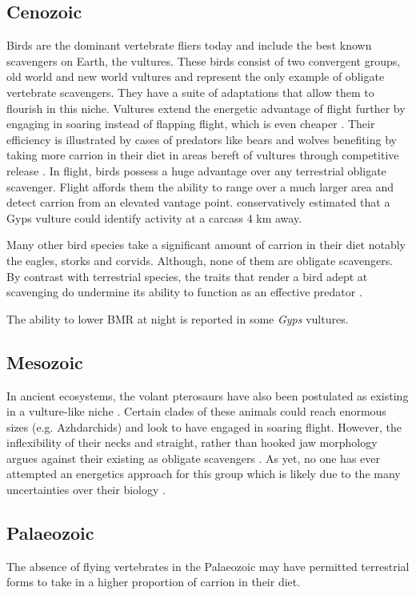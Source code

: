 \documentclass[a4paper,12pt]{article}
\begin{document}
\subsection*{Cenozoic}
Birds are the dominant vertebrate fliers today and include the best known scavengers on Earth, the vultures. 
These birds consist of two convergent groups, old world and new world vultures and represent the only example of obligate vertebrate scavengers. 
They have a suite of adaptations that allow them to flourish in this niche.
Vultures extend the energetic advantage of flight further by engaging in soaring instead of flapping flight, which is even cheaper \citep{hedenstrom1993migration}.
Their efficiency is illustrated by cases of predators like bears and wolves benefiting by taking more carrion in their diet in areas bereft of vultures through competitive release \citep{devault2003scavenging}. 
In flight, birds possess a huge advantage over any terrestrial obligate scavenger. 
Flight affords them the ability to range over a much larger area and detect carrion from an elevated vantage point.
\cite{pennycuick1972soaring} conservatively estimated that a Gyps vulture could identify activity at a carcass 4 km away. 

Many other bird species take a significant amount of carrion in their diet notably the eagles, storks and corvids. 
Although, none of them are obligate scavengers. 
By contrast with terrestrial species, the traits that render a bird adept at scavenging do undermine its ability to function as an effective predator \citep{devault2003scavenging}. 

The ability to lower BMR at night is reported in some \textit{Gyps} vultures. 

\subsection*{Mesozoic}
In ancient ecosystems, the volant pterosaurs have also been postulated as existing in a vulture-like niche \citep{witton2008reappraisal}. 
Certain clades of these animals could reach enormous sizes (e.g. Azhdarchids) and look to have engaged in soaring flight. 
However, the inflexibility of their necks and straight, rather than hooked jaw morphology argues against their existing as obligate scavengers \citep{witton2008reappraisal}. 
As yet, no one has ever attempted an energetics approach for this group which is likely due to the many uncertainties over their biology \citep{witton2010size}. 

\subsection*{Palaeozoic}
The absence of flying vertebrates in the Palaeozoic may have permitted terrestrial forms to take in a higher proportion of carrion in their diet. 
\end{document}
